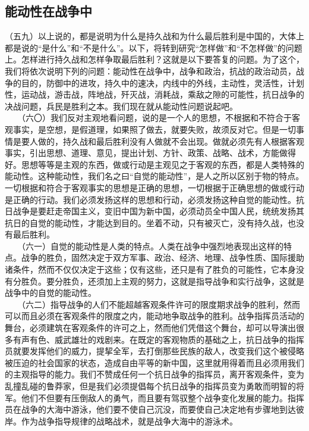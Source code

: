 \documentclass[cn,11pt,chinese]{elegantbook}
\def\myformat#1{\hfil\hfil #1}
\begin{document}
\subsection*{\myformat{能动性在战争中}}
（五九）以上说的，都是说明为什么是持久战和为什么最后胜利是中国的，大体上都是说的“是什么”和“不是什么”。以下，将转到研究“怎样做”和“不怎样做”的问题上。怎样进行持久战和怎样争取最后胜利？这就是以下要答复的问题。为了这个，我们将依次说明下列的问题：能动性在战争中，战争和政治，抗战的政治动员，战争的目的，防御中的进攻，持久中的速决，内线中的外线，主动性，灵活性，计划性，运动战，游击战，阵地战，歼灭战，消耗战，乘敌之隙的可能性，抗日战争的决战问题，兵民是胜利之本。我们现在就从能动性问题说起吧。\\
　　（六〇）我们反对主观地看问题，说的是一个人的思想，不根据和不符合于客观事实，是空想，是假道理，如果照了做去，就要失败，故须反对它。但是一切事情是要人做的，持久战和最后胜利没有人做就不会出现。做就必须先有人根据客观事实，引出思想、道理、意见，提出计划、方针、政策、战略、战术，方能做得好。思想等等是主观的东西，做或行动是主观见之于客观的东西，都是人类特殊的能动性。这种能动性，我们名之曰“自觉的能动性”，是人之所以区别于物的特点。一切根据和符合于客观事实的思想是正确的思想，一切根据于正确思想的做或行动是正确的行动。我们必须发扬这样的思想和行动，必须发扬这种自觉的能动性。抗日战争是要赶走帝国主义，变旧中国为新中国，必须动员全中国人民，统统发扬其抗日的自觉的能动性，才能达到目的。坐着不动，只有被灭亡，没有持久战，也没有最后胜利。\\
　　（六一）自觉的能动性是人类的特点。人类在战争中强烈地表现出这样的特点。战争的胜负，固然决定于双方军事、政治、经济、地理、战争性质、国际援助诸条件，然而不仅仅决定于这些；仅有这些，还只是有了胜负的可能性，它本身没有分胜负。要分胜负，还须加上主观的努力，这就是指导战争和实行战争，这就是战争中的自觉的能动性。\\
　　（六二）指导战争的人们不能超越客观条件许可的限度期求战争的胜利，然而可以而且必须在客观条件的限度之内，能动地争取战争的胜利。战争指挥员活动的舞台，必须建筑在客观条件的许可之上，然而他们凭借这个舞台，却可以导演出很多有声有色、威武雄壮的戏剧来。在既定的客观物质的基础之上，抗日战争的指挥员就要发挥他们的威力，提挈全军，去打倒那些民族的敌人，改变我们这个被侵略被压迫的社会国家的状态，造成自由平等的新中国，这里就用得着而且必须用我们的主观指导的能力。我们不赞成任何一个抗日战争的指挥员，离开客观条件，变为乱撞乱碰的鲁莽家，但是我们必须提倡每个抗日战争的指挥员变为勇敢而明智的将军。他们不但要有压倒敌人的勇气，而且要有驾驭整个战争变化发展的能力。指挥员在战争的大海中游泳，他们要不使自己沉没，而要使自己决定地有步骤地到达彼岸。作为战争指导规律的战略战术，就是战争大海中的游泳术。\\
\end{document}
